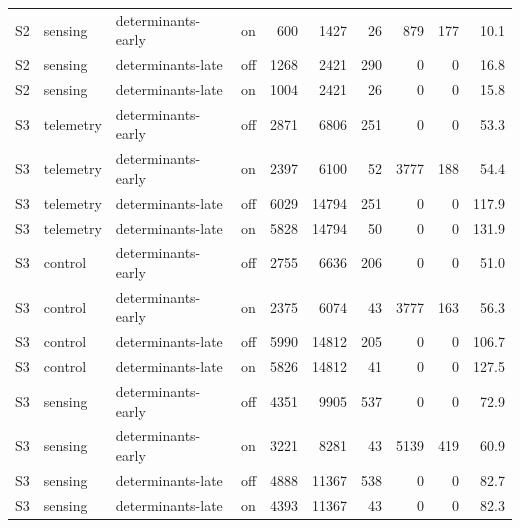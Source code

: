 \begin{tabular}{llllrrrrrr}
S2 & sensing & determinants-early & on & 600 & 1427 & 26 & 879 & 177 & 10.1 \\
S2 & sensing & determinants-late & off & 1268 & 2421 & 290 & 0 & 0 & 16.8 \\
S2 & sensing & determinants-late & on & 1004 & 2421 & 26 & 0 & 0 & 15.8 \\
S3 & telemetry & determinants-early & off & 2871 & 6806 & 251 & 0 & 0 & 53.3 \\
S3 & telemetry & determinants-early & on & 2397 & 6100 & 52 & 3777 & 188 & 54.4 \\
S3 & telemetry & determinants-late & off & 6029 & 14794 & 251 & 0 & 0 & 117.9 \\
S3 & telemetry & determinants-late & on & 5828 & 14794 & 50 & 0 & 0 & 131.9 \\
S3 & control & determinants-early & off & 2755 & 6636 & 206 & 0 & 0 & 51.0 \\
S3 & control & determinants-early & on & 2375 & 6074 & 43 & 3777 & 163 & 56.3 \\
S3 & control & determinants-late & off & 5990 & 14812 & 205 & 0 & 0 & 106.7 \\
S3 & control & determinants-late & on & 5826 & 14812 & 41 & 0 & 0 & 127.5 \\
S3 & sensing & determinants-early & off & 4351 & 9905 & 537 & 0 & 0 & 72.9 \\
S3 & sensing & determinants-early & on & 3221 & 8281 & 43 & 5139 & 419 & 60.9 \\
S3 & sensing & determinants-late & off & 4888 & 11367 & 538 & 0 & 0 & 82.7 \\
S3 & sensing & determinants-late & on & 4393 & 11367 & 43 & 0 & 0 & 82.3 \\
\bottomrule
\end{tabular}
